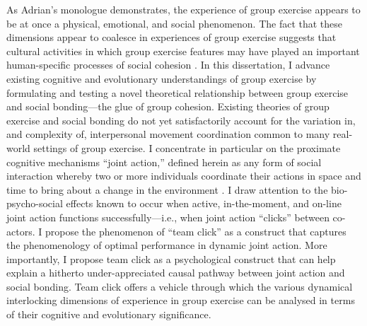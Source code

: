 \begin{CJK}{UTF8}{gbsn}
As Adrian's monologue demonstrates, the experience of group exercise appears to be at once a physical, emotional, and social phenomenon.  The fact that these dimensions appear to coalesce in experiences of group exercise suggests that cultural activities in which group exercise features may have played an important human-specific processes of social cohesion \citep{Dunbar2010,Whitehouse2004,Cohen2017}.  In  this dissertation, I advance existing cognitive and evolutionary understandings of group exercise by formulating and testing a novel theoretical relationship between group exercise and social bonding---the glue of group cohesion.  Existing theories of group exercise and social bonding do not yet satisfactorily account for the variation in, and complexity of, interpersonal movement coordination common to many real-world settings of group exercise.  I concentrate in particular on the proximate cognitive mechanisms  ``joint action,'' defined herein as any form of social interaction whereby two or more individuals coordinate their actions in space and time to bring about a change in the environment \citep{Sebanz2006}.  I draw attention to the bio-psycho-social effects known to occur when active, in-the-moment, and on-line joint action functions successfully---i.e., when joint action ``clicks'' between co-actors.  I propose the phenomenon of ``team click'' as a construct that captures the phenomenology of optimal performance in dynamic joint action.  More importantly, I propose team click as a psychological construct that can help explain a hitherto under-appreciated causal pathway between joint action and social bonding.  Team click offers a vehicle through which the various dynamical interlocking dimensions of experience in group exercise can be analysed in terms of their cognitive and evolutionary significance.



\end{CJK}
